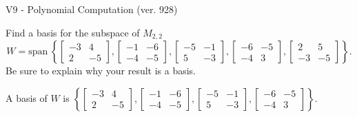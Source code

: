 \begin{exercise}
  \begin{exerciseTitle}V9 - Polynomial Computation (ver. 928)\end{exerciseTitle}
  \begin{exerciseStatement}
    Find a basis for the subspace of \(M_{2,2}\) 
\[W=\mathrm{span}\ \left\{\left[\begin{array}{cc}
-3 & 4 \\
2 & -5
\end{array}\right] , \left[\begin{array}{cc}
-1 & -6 \\
-4 & -5
\end{array}\right] , \left[\begin{array}{cc}
-5 & -1 \\
5 & -3
\end{array}\right] , \left[\begin{array}{cc}
-6 & -5 \\
-4 & 3
\end{array}\right] , \left[\begin{array}{cc}
2 & 5 \\
-3 & -5
\end{array}\right]\right\}.\]
 Be sure to explain why your result is a basis.


  \end{exerciseStatement}
  \begin{exerciseAnswer}
   A basis of \(W\) is  \(\left\{\left[\begin{array}{cc}
-3 & 4 \\
2 & -5
\end{array}\right] , \left[\begin{array}{cc}
-1 & -6 \\
-4 & -5
\end{array}\right] , \left[\begin{array}{cc}
-5 & -1 \\
5 & -3
\end{array}\right] , \left[\begin{array}{cc}
-6 & -5 \\
-4 & 3
\end{array}\right]\right\}\).
  


  \end{exerciseAnswer}
\end{exercise}